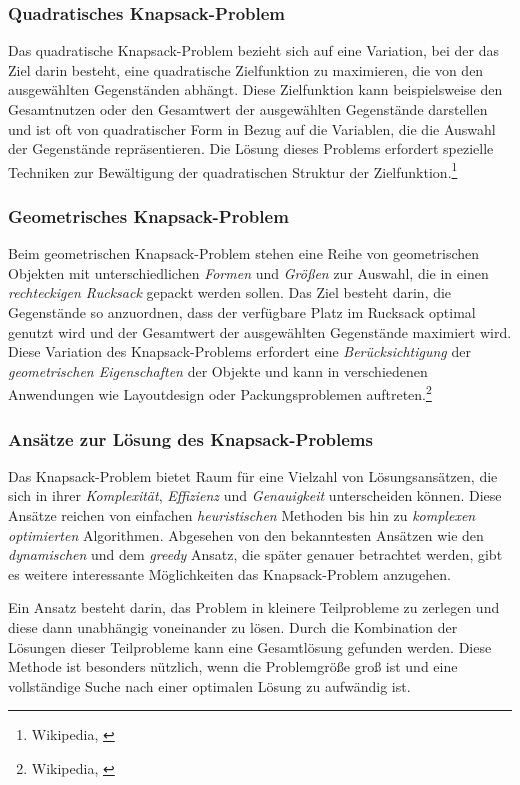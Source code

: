 \subsubsection*{Quadratisches Knapsack-Problem}
Das quadratische Knapsack-Problem bezieht sich auf eine Variation, bei der das Ziel darin besteht, eine quadratische
Zielfunktion zu maximieren, die von den ausgewählten Gegenständen abhängt. Diese Zielfunktion kann beispielsweise den
Gesamtnutzen oder den Gesamtwert der ausgewählten Gegenstände darstellen und ist oft von quadratischer Form in Bezug auf
die Variablen, die die Auswahl der Gegenstände repräsentieren. Die Lösung dieses Problems erfordert spezielle Techniken
zur Bewältigung der quadratischen Struktur der Zielfunktion.\footnote{Wikipedia, \cite{Quadratic Knapsack-Problem}}

\subsubsection*{Geometrisches Knapsack-Problem}
Beim geometrischen Knapsack-Problem stehen eine Reihe von geometrischen Objekten mit unterschiedlichen \textit{Formen}
und \textit{Größen} zur Auswahl, die in einen \textit{rechteckigen Rucksack} gepackt werden sollen. Das Ziel besteht
darin, die Gegenstände so anzuordnen, dass der verfügbare Platz im Rucksack optimal genutzt wird und der Gesamtwert der
ausgewählten Gegenstände maximiert wird. Diese Variation des Knapsack-Problems erfordert eine \textit{Berücksichtigung}
der \textit{geometrischen Eigenschaften} der Objekte und kann in verschiedenen Anwendungen wie Layoutdesign oder
Packungsproblemen auftreten.\footnote{Wikipedia, \cite{Geometric Knapsack-Problem}}

\subsubsection{Ansätze zur Lösung des Knapsack-Problems}
Das Knapsack-Problem bietet Raum für eine Vielzahl von Lösungsansätzen, die sich in ihrer \textit{Komplexität},
\textit{Effizienz} und \textit{Genauigkeit} unterscheiden können. Diese Ansätze reichen von einfachen \textit{heuristischen}
Methoden bis hin zu \textit{komplexen optimierten} Algorithmen. Abgesehen von den bekanntesten Ansätzen wie den
\textit{dynamischen} und dem \textit{greedy} Ansatz, die später genauer betrachtet werden, gibt es weitere interessante
Möglichkeiten das Knapsack-Problem anzugehen.

Ein Ansatz besteht darin, das Problem in kleinere Teilprobleme zu zerlegen und diese dann unabhängig voneinander zu lösen.
Durch die Kombination der Lösungen dieser Teilprobleme kann eine Gesamtlösung gefunden werden. Diese Methode ist besonders
nützlich, wenn die Problemgröße groß ist und eine vollständige Suche nach einer optimalen Lösung zu aufwändig ist.

